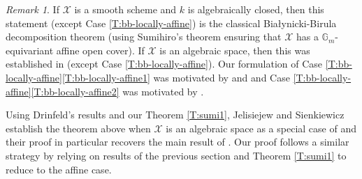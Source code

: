 \documentclass[a4paper]{amsart}
\theoremstyle{plain}
\theoremstyle{definition}
\theoremstyle{remark}
\newtheorem{remark}[theorem]{Remark}
\numberwithin{equation}{section}
\newcommand{\GG}{\mathbb{G}}
\newcommand\cX{\mathcal{X}}
\begin{document}
\begin{remark} If $\cX$ is a smooth scheme and $k$ is algebraically closed, then this statement (except Case \eqref{T:bb-locally-affine}) is the classical Bia\l{}ynicki-Birula decomposition theorem \cite[Thm.~4.1]{bb} (using Sumihiro's theorem \cite[Cor.~2]{sumihiro} ensuring that $\cX$ has a $\GG_m$-equivariant affine open cover).
 If $\cX$ is an algebraic space, then this 
was established in  \cite[Thm.~B.0.3]{drinfeld} (except Case \eqref{T:bb-locally-affine}).  Our formulation of Case \eqref{T:bb-locally-affine}\eqref{T:bb-locally-affine1} was motivated by \cite[Thm.~4.5, p.~69]{hesselink}  and \cite[Prop.~13.58]{milne} and
Case \eqref{T:bb-locally-affine}\eqref{T:bb-locally-affine2} was motivated by \cite[Prop.~7.6]{js-bb}.

Using Drinfeld's results and our Theorem \ref{T:sumi1}, {Jelisiejew} and {Sienkiewicz} establish the theorem above when $\cX$ is an algebraic space as a special case of \cite[Thm.~1.5]{js-bb} and their proof in particular  recovers  the main result of \cite{bb}.  Our proof follows a similar strategy by relying on results of the previous section and Theorem \ref{T:sumi1} to reduce to the affine case.
\end{remark}
\end{document}
